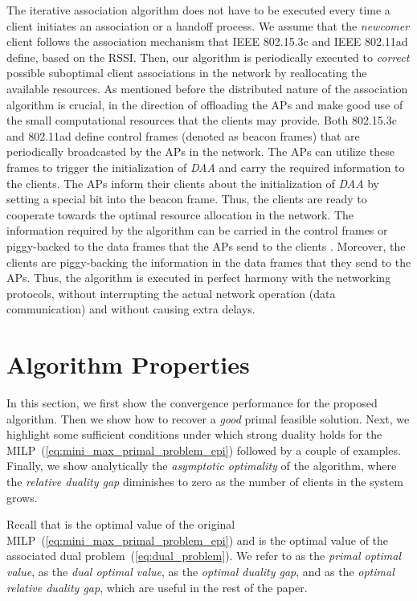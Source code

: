 \documentclass[journal, 10pt, twocolumn]{IEEEtran}
\begin{document}
The iterative association algorithm does not have to be executed every time a client initiates an association or a handoff process. We assume that the \emph{newcomer} client follows the association mechanism that IEEE 802.15.3c and IEEE 802.11ad define, based on the RSSI. Then, our algorithm is periodically executed to \emph{correct} possible suboptimal client associations in the network by reallocating the available resources. As mentioned before the distributed nature of the association algorithm is crucial, in the direction of offloading the APs and make good use of the small computational resources that the clients may provide. Both 802.15.3c and 802.11ad define control frames (denoted as beacon frames) that are periodically broadcasted by the APs in the network. The APs can utilize these frames to trigger the initialization of \emph{DAA} and carry the required information to the clients. The APs inform their clients about the initialization of \emph{DAA} by setting a special bit into the beacon frame. Thus, the clients are ready to cooperate towards the optimal resource allocation in the network. The information required by the algorithm can be carried in the control frames or piggy-backed to the data frames that the APs send to the clients \cite{Athanasiou08}. Moreover, the clients are piggy-backing the information in the data frames that they send to the APs. Thus, the algorithm is executed in perfect harmony with the networking protocols, without interrupting the actual network operation (data communication) and without causing extra delays. 


\section{Algorithm Properties}\label{sec:algorithm_prop}
In this section, we first show the convergence performance for the proposed algorithm. Then we show how to recover a \emph{good} primal feasible solution. Next, we highlight some sufficient conditions under which strong duality holds for the MILP~(\ref{eq:mini_max_primal_problem_epi}) followed by a couple of examples. Finally, we show analytically the \emph{asymptotic optimality} of the algorithm, where the \emph{relative duality gap} diminishes to zero as the number of clients in the system grows.

Recall that  is the optimal value of the original MILP~(\ref{eq:mini_max_primal_problem_epi}) and  is the optimal value of the associated dual problem~(\ref{eq:dual_problem}). We refer to  as the \emph{primal optimal value},  as the \emph{dual optimal value},  as the \emph{optimal duality gap}, and   as the \emph{optimal relative duality gap}, which are useful in the rest of the paper. 
\end{document}
